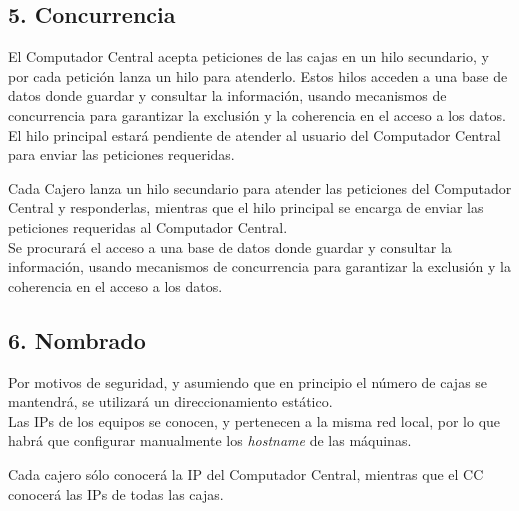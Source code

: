 \subsection*{5. Concurrencia}

El Computador Central acepta peticiones de las cajas en un hilo secundario, y por cada petición lanza un hilo para atenderlo. Estos hilos acceden a una base de datos donde guardar y consultar la información, usando mecanismos de concurrencia para garantizar la exclusión y la coherencia en el acceso a los datos.\\
El hilo principal estará pendiente de atender al usuario del Computador Central para enviar las peticiones requeridas.\newline

Cada Cajero lanza un hilo secundario para atender las peticiones del Computador Central y responderlas, mientras que el hilo principal se encarga de enviar las peticiones requeridas al Computador Central.\\
Se procurará el acceso a una base de datos donde guardar y consultar la información, usando mecanismos de concurrencia para garantizar la exclusión y la coherencia en el acceso a los datos.


\subsection*{6. Nombrado}

Por motivos de seguridad, y asumiendo que en principio el número de cajas se mantendrá, se utilizará un direccionamiento estático.\\
Las IPs de los equipos se conocen, y pertenecen a la misma red local, por lo que habrá que configurar manualmente los \textit{hostname} de las máquinas.\newline

Cada cajero sólo conocerá la IP del Computador Central, mientras que el CC conocerá las IPs de todas las cajas.
